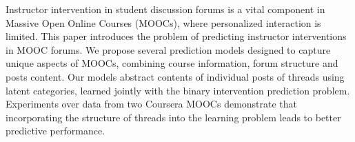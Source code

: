 Instructor intervention in student discussion forums is a vital component in Massive Open Online Courses (MOOCs), where personalized interaction is limited. This paper introduces the problem of predicting instructor interventions in MOOC forums. We propose several prediction models designed to capture unique aspects of MOOCs, combining course information, forum structure and posts content. Our models abstract contents of individual posts of threads using latent categories, learned jointly with the binary intervention prediction problem. Experiments over data from two Coursera MOOCs demonstrate that incorporating the structure of threads into the learning problem leads to better predictive performance.
